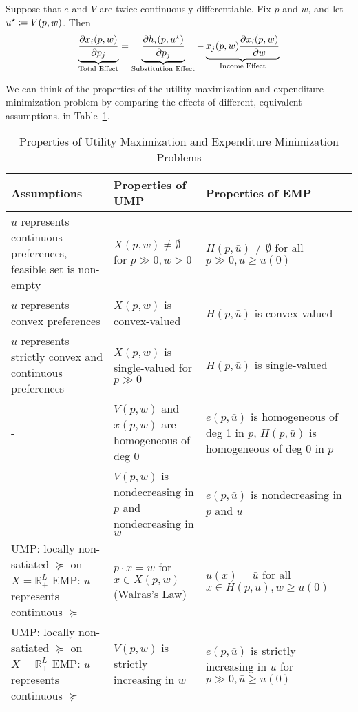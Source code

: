 \documentclass[12pt]{article}
\begin{document}
\begin{proposition}
	 Suppose that $e$ and $V$ are twice continuously differentiable. Fix $p$ and $w$, and let $u^\star \coloneqq V(p,w)$. Then
	\[
	\underbrace{\frac{\partial x_i(p,w)}{\partial p_j}}_{\textnormal{Total Effect}} = \underbrace{\frac{\partial h_i(p,u^\star)}{\partial p_j}}_{\textnormal{Substitution Effect}} - \underbrace{x_j(p,w) \frac{\partial x_i(p,w)}{\partial w}}_{\textnormal{Income Effect}}
	\]
\end{proposition}

We can think of the properties of the utility maximization and expenditure minimization problem by comparing the effects of different, equivalent assumptions, in Table~\ref{tab:ump_emp_problem}.

\begin{table}[H]\label{tab:ump_emp_problem}
	\centering
	\begin{tabular}{|>{\centering\arraybackslash}m{5cm}|>{\centering\arraybackslash}m{5cm}|>{\centering\arraybackslash}m{5cm}|}
	\hline
	\textbf{Assumptions} & \textbf{Properties of UMP} & \textbf{Properties of EMP} \\
	\hline
	$u$ represents continuous preferences, feasible set is non-empty & $X(p,w) \neq \emptyset$ for $p \gg 0, w > 0$ & $H(p,\bar{u}) \neq \emptyset$ for all $p \gg 0, \bar{u} \geq u(0)$ \\
	\hline
	$u$ represents convex preferences & $X(p,w)$ is convex-valued & $H(p,\bar{u})$ is convex-valued \\
	\hline
	$u$ represents strictly convex and continuous preferences & $X(p,w)$ is single-valued for $p \gg 0$ & $H(p,\bar{u})$ is single-valued \\
	\hline
	- & $V(p,w)$ and $x(p,w)$ are homogeneous of deg 0 & $e(p,\bar{u})$ is  homogeneous of deg 1 in $p$, $H(p,\bar{u})$ is  homogeneous of deg 0 in $p$ \\
	\hline
	- & $V(p,w)$ is nondecreasing in $p$ and nondecreasing in $w$ & $e(p,\bar{u})$ is nondecreasing in $p$ and $\bar{u}$ \\
	\hline
	UMP: locally non-satiated $\succeq$ on $X = \mathbb{R}^L_{+}$ \newline EMP: $u$ represents continuous $\succeq$ & $p \cdot x = w$ for $x \in X(p,w)$ (Walras's Law) & $u(x) = \bar{u}$ for all $x \in H(p,\bar{u}), w \geq u(0)$ \\
	\hline
	UMP: locally non-satiated $\succeq$ on $X = \mathbb{R}^L_{+}$ \newline EMP: $u$ represents continuous $\succeq$ & $V(p,w)$ is strictly increasing in $w$ & $e(p,\bar{u})$ is strictly increasing in $\bar{u}$ for $p \gg 0, \bar{u} \geq u(0)$ \\
	\hline
	\end{tabular}
	\caption{Properties of Utility Maximization and Expenditure Minimization Problems}
\end{table}
\end{document}
